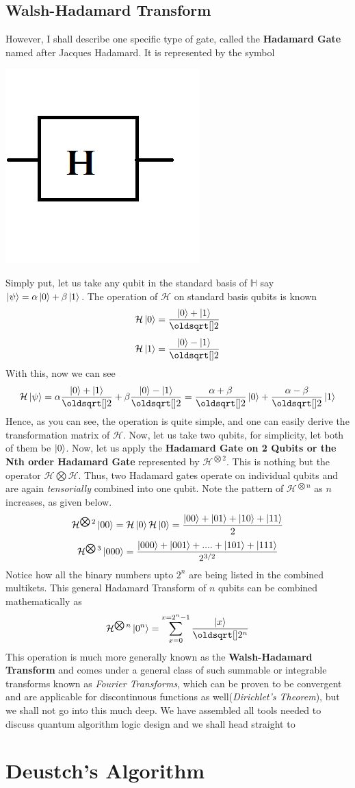 \documentclass[12pt]{article}
\begin{document}
\subsection{Walsh-Hadamard Transform}
However, I shall describe one specific type of gate, called the \textbf{Hadamard Gate} named after Jacques Hadamard. It is represented by the symbol 
\begin{center}
\includegraphics[scale=0.5]{qhad.png}
\end{center}
Simply put, let us take any qubit in the standard basis of $\mathbb{H}$ say $\Ket{\psi} = \alpha\Ket{0} + \beta\Ket{1}$. The operation of $\mathcal{H}$ on standard basis qubits is known $$\mathcal{H}\Ket{0} = \frac{\Ket{0}+\Ket{1}}{\sqrt{2}}$$
$$\mathcal{H}\Ket{1} = \frac{\Ket{0}-\Ket{1}}{\sqrt{2}}$$
With this, now we can see
$$\mathcal{H}\Ket{\psi} = \alpha\frac{\Ket{0}+\Ket{1}}{\sqrt{2}} + \beta\frac{\Ket{0}-\Ket{1}}{\sqrt{2}} = \frac{\alpha + \beta}{\sqrt{2}}\Ket{0} + \frac{\alpha - \beta}{\sqrt{2}}\Ket{1}$$
Hence, as you can see, the operation is quite simple, and one can easily derive the transformation matrix of $\mathcal{H}$. Now, let us take two qubits, for simplicity, let both of them be $\Ket{0}$. Now, let us apply the \textbf{Hadamard Gate on 2 Qubits or the Nth order Hadamard Gate} represented by $\mathcal{H}^{\bigotimes 2}$. This is nothing but the operator $\mathcal{H}\bigotimes\mathcal{H}$. Thus, two Hadamard gates operate on individual qubits and are again \textit{tensorially} combined into one qubit. Note the pattern of $\mathcal{H}^{\bigotimes n}$ as $n$ increases, as given below.
$$\mathcal{H}^{\bigotimes 2}\Ket{00} = \mathcal{H}\Ket{0}\mathcal{H}\Ket{0} = \frac{\Ket{00}+\Ket{01}+\Ket{10}+\Ket{11}}{2}$$
$$\mathcal{H}^{\bigotimes 3}\Ket{000} = \frac{\Ket{000}+\Ket{001}+....+\Ket{101}+\Ket{111}}{2^{3/2}}$$ Notice how all the binary numbers upto $2^n$ are being listed in the combined multikets. This general Hadamard Transform of $n$ qubits can be combined mathematically as
$$\mathcal{H}^{\bigotimes n}\Ket{0^n} = \sum_{x=0}^{x=2^n-1}\frac{\Ket{x}}{\sqrt{2^n}}$$ This operation is much more generally known as the \textbf{Walsh-Hadamard Transform} and comes under a general class of such summable or integrable transforms known as \textit{Fourier Transforms}, which can be proven to be convergent and are applicable for discontinuous functions as well(\textit{Dirichlet's Theorem}), but we shall not go into this much deep. We have assembled all tools needed to discuss quantum algorithm logic design and we shall head straight to
\section{Deustch's Algorithm}
\end{document}
